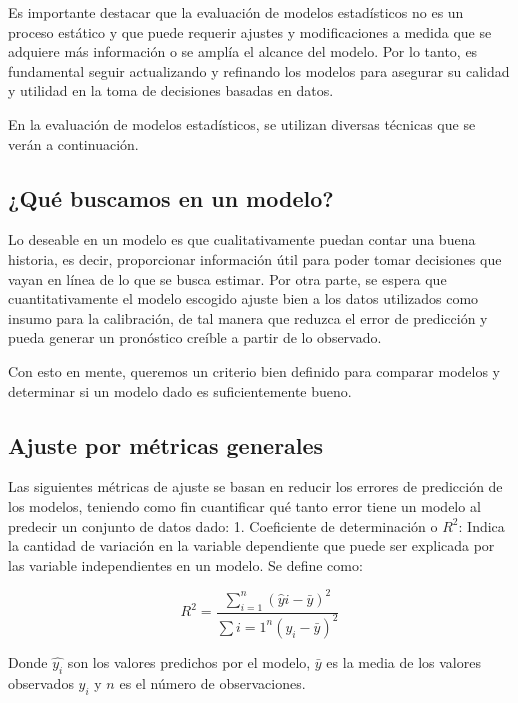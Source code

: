 \documentclass[
]{book}
\begin{document}
Es importante destacar que la evaluación de modelos estadísticos no es
un proceso estático y que puede requerir ajustes y modificaciones a
medida que se adquiere más información o se amplía el alcance del
modelo. Por lo tanto, es fundamental seguir actualizando y refinando los
modelos para asegurar su calidad y utilidad en la toma de decisiones
basadas en datos.

En la evaluación de modelos estadísticos, se utilizan diversas técnicas
que se verán a continuación.

\hypertarget{quuxe9-buscamos-en-un-modelo}{%
\subsection{¿Qué buscamos en un modelo?}\label{quuxe9-buscamos-en-un-modelo}}

Lo deseable en un modelo es que cualitativamente puedan contar una buena
historia, es decir, proporcionar información útil para poder tomar
decisiones que vayan en línea de lo que se busca estimar. Por otra
parte, se espera que cuantitativamente el modelo escogido ajuste bien a
los datos utilizados como insumo para la calibración, de tal manera que
reduzca el error de predicción y pueda generar un pronóstico creíble a
partir de lo observado.

Con esto en mente, queremos un criterio bien definido para comparar
modelos y determinar si un modelo dado es suficientemente bueno.

\hypertarget{ajuste-por-muxe9tricas-generales}{%
\subsection{Ajuste por métricas generales}\label{ajuste-por-muxe9tricas-generales}}

Las siguientes métricas de ajuste se basan en reducir los errores de
predicción de los modelos, teniendo como fin cuantificar qué tanto error
tiene un modelo al predecir un conjunto de datos dado: 1. Coeficiente de
determinación o \(R^2\): Indica la cantidad de variación en la variable
dependiente que puede ser explicada por las variable independientes en
un modelo. Se define como:

\[ R^2 = \frac{\sum_{i=1}^n (\hat{y}i - \bar{y})^2}{\sum{i=1}^n (y_i - \bar{y})^2} \]

Donde \(\hat{y_i}\) son los valores predichos por el modelo, \(\bar{y}\) es
la media de los valores observados \(y_i\) y \(n\) es el número de
observaciones.
\end{document}
